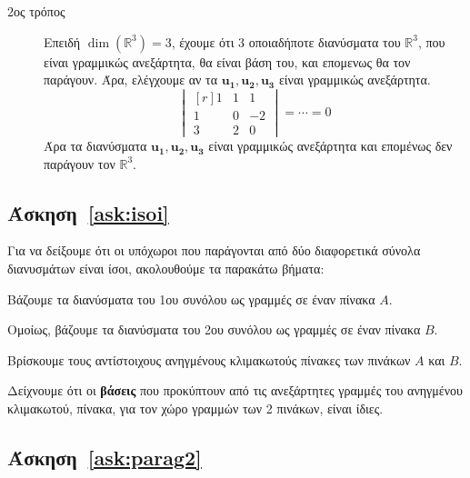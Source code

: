 \documentclass[a4paper,table]{report}
\begin{document}
\begin{description}
  \item[2ος τρόπος] 
    Επειδή $ \dim(\mathbb{R}^{3}) = 3 $, έχουμε ότι 3 οποιαδήποτε διανύσματα του $
    \mathbb{R}^{3} $, που είναι γραμμικώς ανεξάρτητα, θα είναι βάση του, και επομενως
    θα τον παράγουν. Άρα, ελέγχουμε αν τα 
    $ \mathbf{u_{1}}, \mathbf{u_{2}}, \mathbf{u_{3}} $ είναι γραμμικώς ανεξάρτητα.
    \[
      \begin{vmatrix*}[r]
        1 & 1 & 1 \\
        1 & 0 & -2 \\
        3 & 2 & 0 
      \end{vmatrix*} = \cdots = 0
    \] 
    Άρα τα διανύσματα $ \mathbf{u_{1}}, \mathbf{u_{2}}, \mathbf{u_{3}}$ είναι 
    γραμμικώς ανεξάρτητα και επομένως δεν παράγουν τον $ \mathbb{R}^{3}$.
\end{description}



\subsection*{Άσκηση~\ref{ask:isoi}}

Για να δείξουμε ότι οι υπόχωροι που παράγονται από δύο διαφορετικά σύνολα διανυσμάτων
είναι ίσοι, ακολουθούμε τα παρακάτω βήματα:
\begin{myitemize}
  \item Βάζουμε τα διανύσματα του 1ου συνόλου ως \textcolor{Col1}{γραμμές} σε έναν 
    πίνακα $A$.
  \item Ομοίως, βάζουμε τα διανύσματα του 2ου συνόλου ως \textcolor{Col1}{γραμμές} 
    σε έναν πίνακα $Β$.
  \item Βρίσκουμε τους αντίστοιχους \textcolor{Col1}{ανηγμένους κλιμακωτούς} πίνακες 
    των πινάκων $A$ και $B$.
  \item Δείχνουμε ότι οι \textbf{βάσεις} που προκύπτουν από τις ανεξάρτητες γραμμές του 
    \textcolor{Col1}{ανηγμένου κλιμακωτού}, πίνακα, για τον χώρο γραμμών των 2 πινάκων, 
    είναι \textcolor{Col1}{ίδιες}.
\end{myitemize}

\subsection*{Άσκηση~\ref{ask:parag2}}
\end{document}
